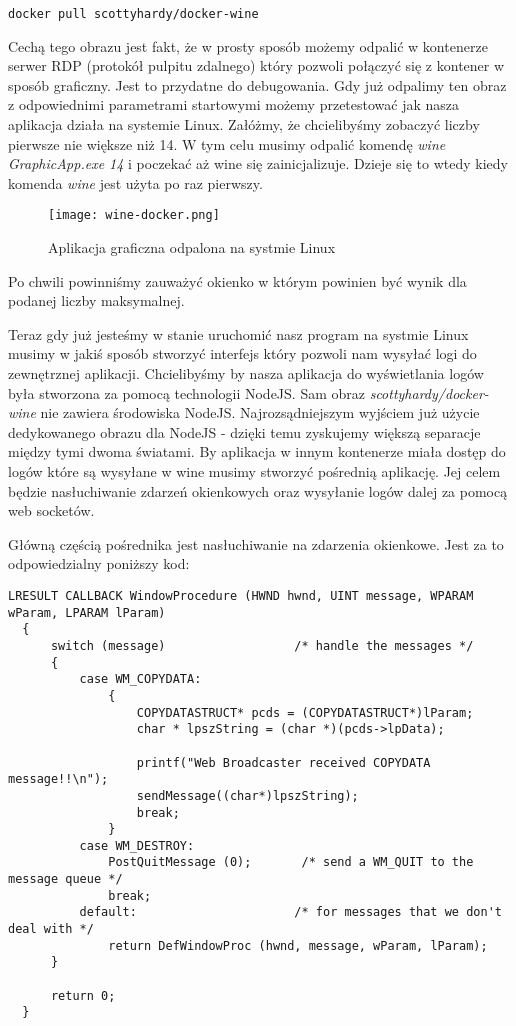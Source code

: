 \begin{lstlisting}[caption={Pobierania obrazu który ma zainstalowane środowisko wine}]
  docker pull scottyhardy/docker-wine
\end{lstlisting}
Cechą tego obrazu jest fakt, że w prosty sposób możemy odpalić w kontenerze serwer RDP (protokół pulpitu zdalnego) który pozwoli połączyć się z kontener w sposób graficzny. Jest to przydatne do debugowania. Gdy już odpalimy ten obraz z odpowiednimi parametrami startowymi możemy przetestować jak nasza aplikacja działa na systemie Linux. Załóżmy, że chcielibyśmy zobaczyć liczby pierwsze nie większe niż 14. W tym celu musimy odpalić komendę \textit{wine GraphicApp.exe 14} i poczekać aż wine się zainicjalizuje. Dzieje się to wtedy kiedy komenda \textit{wine} jest użyta po raz pierwszy.
\begin{figure}[htbp]
  \centering
  \texttt{[image: wine-docker.png]}
  \caption{Aplikacja graficzna odpalona na systmie Linux}
  \label{fig:wine_docker}
\end{figure}
Po chwili powinniśmy zauważyć okienko w którym powinien być wynik dla podanej liczby maksymalnej.
\par
Teraz gdy już jesteśmy w stanie uruchomić nasz program na systmie Linux musimy w jakiś sposób stworzyć interfejs który pozwoli nam wysyłać logi do zewnętrznej aplikacji. Chcielibyśmy by nasza aplikacja do wyświetlania logów była stworzona za pomocą technologii NodeJS. Sam obraz \textit{scottyhardy/docker-wine} nie zawiera środowiska NodeJS. Najrozsądniejszym wyjściem już użycie dedykowanego obrazu dla NodeJS - dzięki temu zyskujemy większą separacje między tymi dwoma światami. By aplikacja w innym kontenerze miała dostęp do logów które są wysyłane w wine musimy stworzyć pośrednią aplikację. Jej celem będzie nasłuchiwanie zdarzeń okienkowych oraz wysyłanie logów dalej za pomocą web socketów. 
\par
Główną częścią pośrednika jest nasłuchiwanie na zdarzenia okienkowe. Jest za to odpowiedzialny poniższy kod:
\begin{lstlisting}[caption={Fragment aplikacji odpowiedzialnej za dalsze przekazywanie logów}]
  LRESULT CALLBACK WindowProcedure (HWND hwnd, UINT message, WPARAM wParam, LPARAM lParam)
  {
      switch (message)                  /* handle the messages */
      {
          case WM_COPYDATA:
              {
                  COPYDATASTRUCT* pcds = (COPYDATASTRUCT*)lParam;
                  char * lpszString = (char *)(pcds->lpData);

                  printf("Web Broadcaster received COPYDATA message!!\n");
                  sendMessage((char*)lpszString);
                  break;
              }
          case WM_DESTROY:
              PostQuitMessage (0);       /* send a WM_QUIT to the message queue */
              break;
          default:                      /* for messages that we don't deal with */
              return DefWindowProc (hwnd, message, wParam, lParam);
      }

      return 0;
  }
\end{lstlisting}
